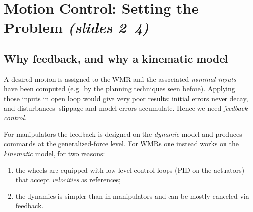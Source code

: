 \documentclass[11pt,a4paper]{article}
\theoremstyle{definition}
\theoremstyle{plain}
\theoremstyle{remark}
\begin{document}
\section{Motion Control: Setting the Problem \texorpdfstring{\emph{(slides 2--4)}}{(slides 2--4)}}

\subsection{Why feedback, and why a kinematic model}

A desired motion is assigned to the WMR and the associated \emph{nominal inputs} have been computed (e.g.\ by the planning techniques seen before). Applying those inputs in open loop would give very poor results: initial errors never decay, and disturbances, slippage and model errors accumulate. Hence we need \emph{feedback control}.

For manipulators the feedback is designed on the \emph{dynamic} model and produces commands at the generalized-force level. For WMRs one instead works on the \emph{kinematic} model, for two reasons:
\begin{enumerate}[label=(\arabic*),nosep]
\item the wheels are equipped with low-level control loops (PID on the actuators) that accept \emph{velocities} as references;
\item the dynamics is simpler than in manipulators and can be mostly canceled via feedback.
\end{enumerate}
\end{document}
